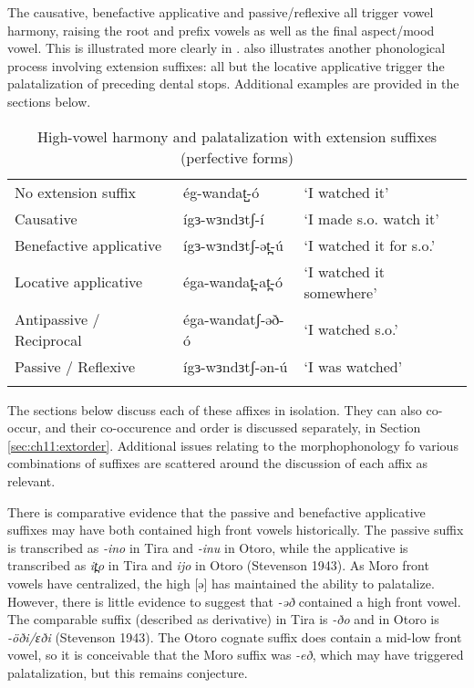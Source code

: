 The causative, benefactive applicative and passive/reflexive all trigger vowel harmony, raising the root and prefix vowels as well as the final aspect/mood vowel. This is illustrated more clearly in .  also illustrates another phonological process involving extension suffixes: all but the locative applicative trigger the palatalization of preceding dental stops. Additional examples are provided in the sections below.

\begin{table} %
\caption{High-vowel harmony and palatalization with extension suffixes (perfective forms)} \label{tab:ch11:exvh}
\begin{tabular}[t]{lll}
\lsptoprule
No extension suffix &  ég-wandat̺-ó  &  ‘I watched it’  \\
Causative & 	ígɜ-wɜndɜtʃ-í & `I made s.o. watch it'\\
Benefactive applicative & ígɜ-wɜndɜtʃ-ət̪-ú	& ‘I watched it for s.o.’ \\
Locative applicative & éga-wandat̪-at̪-ó	& ‘I watched it somewhere’ \\
Antipassive / Reciprocal &  éga-wandatʃ-əð-ó & ‘I watched s.o.’ \\
Passive / Reflexive & ígɜ-wɜndɜtʃ-ən-ú	& ‘I was watched’ \\
\lspbottomrule
\end{tabular}
\end{table}

The sections below discuss each of these affixes in isolation. They can also co-occur, and their co-occurence and order is discussed separately, in Section \ref{sec:ch11:extorder}. Additional issues relating to the morphophonology fo various combinations of suffixes are scattered around the discussion of each affix as relevant.

There is comparative evidence that the passive and benefactive applicative suffixes may have both contained high front vowels historically. The passive suffix is transcribed as \textit{-ino} in Tira and \textit{-inu} in Otoro, while the applicative is transcribed as \textit{it̪o} in Tira and \textit{ijo} in Otoro (Stevenson 1943). As Moro front vowels have centralized, the high [ə] has maintained the ability to palatalize. However, there is little evidence to suggest that \textit{-əð} contained a high front vowel. The comparable suffix (described as derivative) in Tira is \textit{-ðo} and in Otoro is \textit{-öði/ɛði} (Stevenson 1943). The Otoro cognate suffix does contain a mid-low front vowel, so it is conceivable that the Moro suffix was \textit{-eð}, which may have triggered palatalization, but this remains conjecture.



